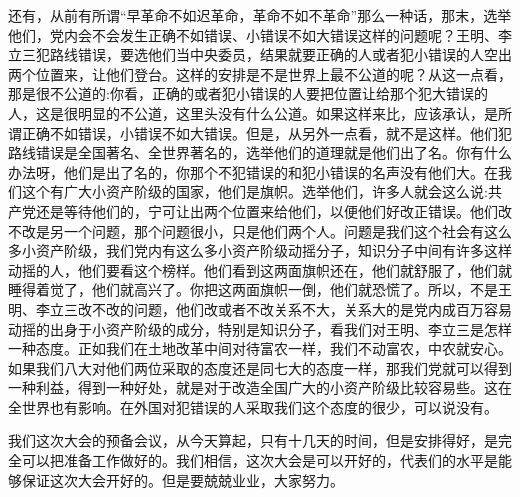 还有，从前有所谓“早革命不如迟革命，革命不如不革命”那么一种话，那末，选举他们，党内会不会发生正确不如错误、小错误不如大错误这样的问题呢？王明、李立三犯路线错误，要选他们当中央委员，结果就要正确的人或者犯小错误的人空出两个位置来，让他们登台。这样的安排是不是世界上最不公道的呢？从这一点看，那是很不公道的:你看，正确的或者犯小错误的人要把位置让给那个犯大错误的人，这是很明显的不公道，这里头没有什么公道。如果这样来比，应该承认，是所谓正确不如错误，小错误不如大错误。但是，从另外一点看，就不是这样。他们犯路线错误是全国著名、全世界著名的，选举他们的道理就是他们出了名。你有什么办法呀，他们是出了名的，你那个不犯错误的和犯小错误的名声没有他们大。在我们这个有广大小资产阶级的国家，他们是旗帜。选举他们，许多人就会这么说:共产党还是等待他们的，宁可让出两个位置来给他们，以便他们好改正错误。他们改不改是另一个问题，那个问题很小，只是他们两个人。问题是我们这个社会有这么多小资产阶级，我们党内有这么多小资产阶级动摇分子，知识分子中间有许多这样动摇的人，他们要看这个榜样。他们看到这两面旗帜还在，他们就舒服了，他们就睡得着觉了，他们就高兴了。你把这两面旗帜一倒，他们就恐慌了。所以，不是王明、李立三改不改的问题，他们改或者不改关系不大，关系大的是党内成百万容易动摇的出身于小资产阶级的成分，特别是知识分子，看我们对王明、李立三是怎样一种态度。正如我们在土地改革中间对待富农一样，我们不动富农，中农就安心。如果我们八大对他们两位采取的态度还是同七大的态度一样，那我们党就可以得到一种利益，得到一种好处，就是对于改造全国广大的小资产阶级比较容易些。这在全世界也有影响。在外国对犯错误的人采取我们这个态度的很少，可以说没有。

我们这次大会的预备会议，从今天算起，只有十几天的时间，但是安排得好，是完全可以把准备工作做好的。我们相信，这次大会是可以开好的，代表们的水平是能够保证这次大会开好的。但是要兢兢业业，大家努力。
